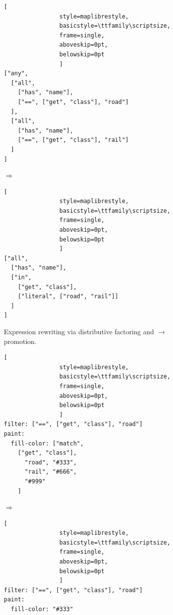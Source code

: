 \begin{figure}[ht]
	\centering

	\begin{subfigure}[t]{\linewidth}
		\centering

		\begin{minipage}[c]{0.45\linewidth}
			\centering
			\begin{lstlisting}[
				style=maplibrestyle,
				basicstyle=\ttfamily\scriptsize,
				frame=single,
				aboveskip=0pt,
				belowskip=0pt
				]
["any",
  ["all",
    ["has", "name"],
    ["==", ["get", "class"], "road"]
  ],
  ["all",
    ["has", "name"],
    ["==", ["get", "class"], "rail"]
  ]
]\end{lstlisting}
		\end{minipage}
		\hfill
		\begin{minipage}[c]{0.08\linewidth}
			\centering
			\vfill
			{\Huge$\Longrightarrow$}
			\vfill
		\end{minipage}
		\hfill
		\begin{minipage}[c]{0.45\linewidth}
			\centering
			\begin{lstlisting}[
				style=maplibrestyle,
				basicstyle=\ttfamily\scriptsize,
				frame=single,
				aboveskip=0pt,
				belowskip=0pt
				]
["all",
  ["has", "name"],
  ["in",
    ["get", "class"],
    ["literal", ["road", "rail"]]
  ]
]\end{lstlisting}
		\end{minipage}

		\caption{
Expression rewriting via distributive factoring and $\to$ promotion.}
		\label{fig:expr_a}
	\end{subfigure}

	\vspace{4mm}

	\begin{subfigure}[t]{\linewidth}
		\centering

		\begin{minipage}[c]{0.45\linewidth}
			\centering
			\begin{lstlisting}[
				style=maplibrestyle,
				basicstyle=\ttfamily\scriptsize,
				frame=single,
				aboveskip=0pt,
				belowskip=0pt
				]
filter: ["==", ["get", "class"], "road"]
paint:
  fill-color: ["match",
    ["get", "class"],
      "road", "#333",
      "rail", "#666",
      "#999"
    ]\end{lstlisting}
		\end{minipage}
		\hfill
		\begin{minipage}[c]{0.08\linewidth}
			\centering
			\vfill
			{\Huge$\Longrightarrow$}
			\vfill
		\end{minipage}
		\hfill
		\begin{minipage}[c]{0.45\linewidth}
			\centering
			\begin{lstlisting}[
				style=maplibrestyle,
				basicstyle=\ttfamily\scriptsize,
				frame=single,
				aboveskip=0pt,
				belowskip=0pt
				]
filter: ["==", ["get", "class"], "road"]
paint:
  fill-color: "#333"\end{lstlisting}
		\end{minipage}


\end{subfigure}
\end{figure}
